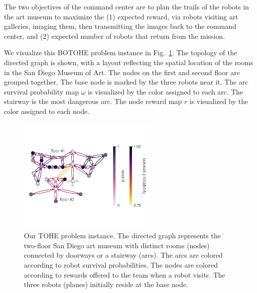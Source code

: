 \documentclass[fleqn,10pt,lineno]{wlpeerj}
\begin{document}
The two objectives of the command center are to plan the trails of the robots in the art museum to maximize the (1) expected reward, via robots visiting art galleries, imaging them, then transmitting the images back to the command center, and (2) expected number of robots that return from the mission. 

We visualize this BOTOHE problem instance in Fig.~\ref{fig:ex_setup}. 
The topology of the directed graph is shown, with a layout reflecting the spatial location of the rooms in the San Diego Museum of Art. The nodes on the first and second floor are grouped together.
The base node is marked by the three robots near it.
The arc survival probability map $\omega$ is visualized by the color assigned to each arc.
The stairway is the most dangerous arc.
The node reward map $r$ is visualized by the color assigned to each node. 


\begin{figure}[h!]
    \centering
    	\includegraphics[width=0.6\textwidth]{art_museum_full_setup.pdf}
    \caption{Our TOHE problem instance. The directed graph represents the two-floor San Diego art museum with distinct rooms (nodes) connected by doorways or a stairway (arcs). The arcs are colored according to robot survival probabilities. The nodes are colored according to rewards offered to the team when a robot visits. The three robots (planes) initially reside at the base node. %
    } \label{fig:ex_setup}
\end{figure}
\end{document}
